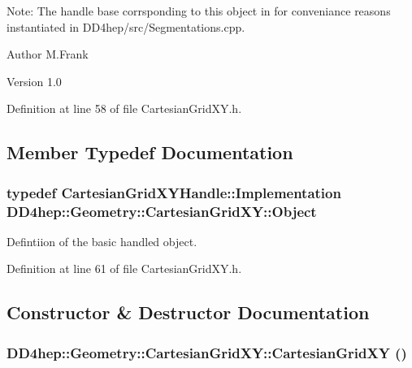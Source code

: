 Note: The handle base corrsponding to this object in for conveniance reasons instantiated in DD4hep/src/Segmentations.cpp.

\begin{DoxyAuthor}{Author}
M.Frank 
\end{DoxyAuthor}
\begin{DoxyVersion}{Version}
1.0 
\end{DoxyVersion}


Definition at line 58 of file CartesianGridXY.h.

\subsection{Member Typedef Documentation}
\hypertarget{class_d_d4hep_1_1_geometry_1_1_cartesian_grid_x_y_ab59ffe7391d8eb8e0b922e7965272808}{
\subsubsection[{Object}]{\setlength{\rightskip}{0pt plus 5cm}typedef {\bf CartesianGridXYHandle::Implementation} {\bf DD4hep::Geometry::CartesianGridXY::Object}}}
\label{class_d_d4hep_1_1_geometry_1_1_cartesian_grid_x_y_ab59ffe7391d8eb8e0b922e7965272808}


Defintiion of the basic handled object. 

Definition at line 61 of file CartesianGridXY.h.

\subsection{Constructor \& Destructor Documentation}
\hypertarget{class_d_d4hep_1_1_geometry_1_1_cartesian_grid_x_y_a4ff0e0264e97768c0d368507ee149ebf}{
\subsubsection[{CartesianGridXY}]{\setlength{\rightskip}{0pt plus 5cm}DD4hep::Geometry::CartesianGridXY::CartesianGridXY ()}}
\label{class_d_d4hep_1_1_geometry_1_1_cartesian_grid_x_y_a4ff0e0264e97768c0d368507ee149ebf}


